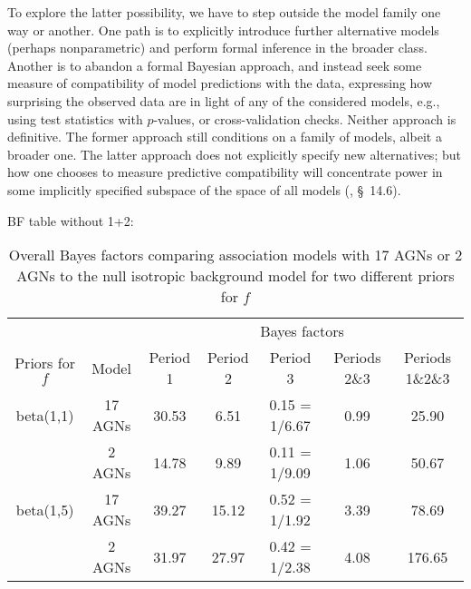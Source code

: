 
To explore the latter possibility, we have to step outside the model family
one way or another.  One path is to explicitly introduce further alternative
models (perhaps nonparametric) and perform formal inference in the broader
class.  Another is to abandon a formal Bayesian approach, and instead seek
some measure of compatibility of model predictions with the data, expressing
how surprising the observed data are in light of any of the considered
models, e.g., using test statistics with $p$-values, or cross-validation
checks.  Neither approach is definitive.  The former approach still
conditions on a family of models, albeit a broader one.  The latter approach
does not explicitly specify new alternatives; but how one chooses to measure
predictive compatibility will concentrate power in some implicitly specified
subspace of the space of all models (, \S~14.6).


BF table without 1+2:

\begin{table}
\begin{tabular}{|c|c|c |c| c| c| c|}
\hline
& & \multicolumn{5}{|c|}{Bayes factors}\\
\cline{3-7}
 Priors for $f$ & Model &Period 1 & Period 2 & Period 3 & Periods 2\&3 & Periods 1\&2\&3\\
\hline
beta(1,1) & 17 AGNs & 30.53 & 6.51 & 0.15 = 1/6.67 & 0.99 & 25.90\\
 & 2 AGNs  & 14.78 & 9.89 & 0.11 = 1/9.09 & 1.06 & 50.67\\
\hline
beta(1,5) & 17 AGNs & 39.27 & 15.12 & 0.52 = 1/1.92 & 3.39 & 78.69\\
 & 2 AGNs  & 31.97 & 27.97 & 0.42 = 1/2.38 & 4.08 & 176.65\\
\hline
\end{tabular}
\caption{Overall Bayes factors comparing association models with 17 AGNs
or 2 AGNs to the null isotropic background model for two different priors for $f$}\label{tab:BFtab}
\label{BFTable}
\end{table}
